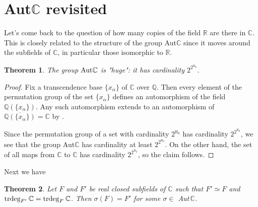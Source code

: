 \documentclass[11pt]{article}
\theoremstyle{plain}
\newtheorem{theorem}{Theorem}[section]
\theoremstyle{definition}
\theoremstyle{remark}
\begin{document}
\section{Aut$\mathbb{C}$ revisited}

Let's come back to the question of how many copies of the field $\mathbb{R}$ are there in $\mathbb{C}$. This is closely related to the structure of the group Aut$\mathbb{C}$ since it moves around the subfields of $\mathbb{C}$, in particular those isomorphic to $\mathbb{R}$.

\begin{theorem}
    The group $\textnormal{Aut} \mathbb{C}$ is "huge": it has cardinality $2^{2^{\aleph_0}}$.
\end{theorem}

\begin{proof}
    Fix a transcendence base $\{x_\alpha\}$ of $\mathbb{C}$ over $\mathbb{Q}$. Then every element of the permutation group of the set $\{x_\alpha\}$ defines an automorphism of the field $\mathbb{Q}(\{x_\alpha\})$. Any such automorphism extends to an automorphism of $\overline{\mathbb{Q}(\{x_\alpha\})} = \mathbb{C}$ by \cite[Ch.V, Thm.3.8]{Hungerford}. 
    \par
    Since the permutation group of a set with cardinality $2^{\aleph_0}$ has cardinality $2^{2^{\aleph_0}}$, we see that the group Aut$\mathbb{C}$ has cardinality at least $2^{2^{\aleph_0}}$. On the other hand, the set of all maps from $\mathbb{C}$ to $\mathbb{C}$ has cardinality $2^{2^{\aleph_0}}$, so the claim follows.
\end{proof}

Next we have 

\begin{theorem} \label{realclosedThm}
    Let $F$ and $F'$ be real closed subfields of $\mathbb{C}$ such that $F' \simeq F$ and  $\textnormal{trdeg}_{F'}\: \mathbb{C} = \textnormal{trdeg}_{F}\: \mathbb{C}$. Then $\sigma(F) = F'$ for some $\sigma \in $ \textnormal{Aut}$\,\mathbb{C}$.
\end{theorem}
\end{document}
